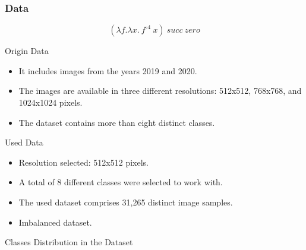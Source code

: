 \documentclass[dvipsnames,mathserif]{beamer}
\begin{document}
{    \begin{frame}
      \frametitle{Data}

      \[(\lambda f. \lambda x.\ f^{\circ 4}\ x)\ succ\ zero\]
    \end{frame}

    \begin{frame}

      \large Origin Data
      \vspace{0.25cm}

      \footnotesize

      \begin{itemize}
        \item It includes images from the years 2019 and 2020.
        \item The images are available in three different resolutions: 512x512,
          768x768, and 1024x1024 pixels.
        \item The dataset contains more than eight distinct classes.
      \end{itemize}

    \end{frame}


    \begin{frame}

      \large Used Data
      \vspace{0.25cm}

      \footnotesize

      \begin{itemize}
        \item Resolution selected: 512x512 pixels.
        \item A total of 8 different classes were selected to work with.
        \item The used dataset comprises 31,265 distinct image samples.
        \item Imbalanced dataset.
      \end{itemize}

    \end{frame}

    \begin{frame}

      \large Classes Distribution in the Dataset
      \vspace{0.25cm}


\end{frame}}
\end{document}
